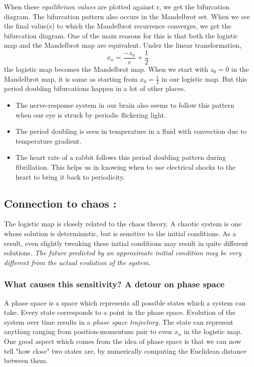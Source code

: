 \documentclass{article}
\begin{document}
When these \emph{equilibrium values} are plotted against r, we get the bifurcation diagram. The bifurcation pattern also occurs in the Mandelbrot set. When we see the final value(s) to which the Mandelbrot recurrence converges, we get the bifurcation diagram. One of the main reasons for this is that both the logistic map and the Mandelbrot map are equivalent. Under the linear transformation,
\begin{equation}
    x_n = \frac{-z_n}{r} + \frac{1}{2}
\end{equation}
the logistic map becomes the Mandelbrot map. When we start with $z_0 = 0$ in the Mandelbrot map, it is same as starting from $x_0 = \frac{1}{2}$ in our logistic map.
But this period doubling bifurcations happen in a lot of other places. 
\begin{itemize}
\item The nerve-response system in our brain also seems to follow this pattern when our eye is struck by periodic flickering light.
\item The period doubling is seen in temperature in a fluid with convection due to temperature gradient.
\item The heart rate of a rabbit follows this period doubling pattern during fibrillation. This helps us in knowing when to use electrical shocks to the heart to bring it back to periodicity.
\end{itemize}
\subsection*{Connection to chaos : }
The logistic map is closely related to the chaos theory. A chaotic system is one whose solution is deterministic, but is sensitive to the initial conditions. As a result, even slightly tweaking these initial conditions may result in quite different solutions. \emph{The future predicted by an approximate initial condition may be very different from the actual evolution of the system.}
\subsubsection*{What causes this sensitivity? A detour on phase space}
A phase space is a space which represents all possible  states which a system can take. Every state corresponds to a point in the phase space. Evolution of the system over time results in a \emph{phase space trajectory}. The state can represent anything ranging from position-momentum pair to even $x_n$ in the logistic map. One good aspect which comes from the idea of phase space is that we can now tell "how close" two states are, by numerically computing the Euclidean distance between them. 
\end{document}
